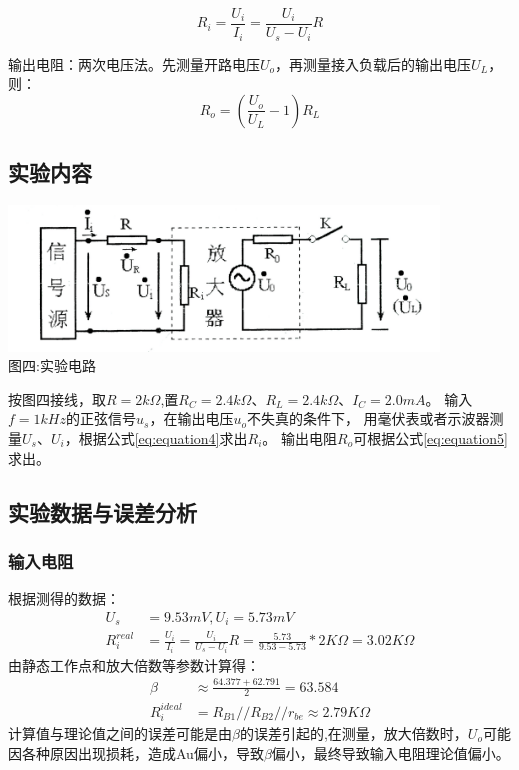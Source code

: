 \documentclass[a4paper]{article}
\begin{document}
    \begin{equation}
        R_i=\frac{U_i}{I_i}=\frac{U_i}{U_s-U_i}R\label{eq:equation4}
    \end{equation}

    {{输出电阻：两次电压法。先测量开路电压$U_o$，再测量接入负载后的输出电压$U_L$，则：}}
    \begin{equation}
        R_o=(\frac{U_o}{U_L}-1)R_L\label{eq:equation5}
    \end{equation}

    \subsection{实验内容}\label{subsec:10}
    \begin{center}
        \includegraphics[height=110pt]{R}\\
        {\small 图四:实验电路}
    \end{center}

    {{按图四接线，取$R=2k\Omega$,置$R_C=2.4k\Omega$、$R_L=2.4k\Omega$、$I_C=2.0mA$。
    输入$f=1kHz$的正弦信号$u_s$，在输出电压$u_o$不失真的条件下，
    用毫伏表或者示波器测量$U_s$、$U_i$，根据公式\eqref{eq:equation4}求出$R_i$。}}
    {{输出电阻$R_o$可根据公式\eqref{eq:equation5}求出。}}

    \subsection{实验数据与误差分析}\label{subsec:11}

    \subsubsection{输入电阻}
    {{根据测得的数据：}}
    \begin{equation}
        \begin{aligned}
            U_s&=9.53mV,U_i=5.73mV\\
            R_i^{real}&=\frac{U_i}{I_i}=\frac{U_i}{U_s-U_i}R=\frac{5.73}{9.53-5.73}*2K\Omega=3.02K\Omega
        \end{aligned}\label{eq:equation6}
    \end{equation}
    {{由静态工作点和放大倍数等参数计算得：}}
    \begin{equation}
        \begin{aligned}
            \beta&\approx\frac{64.377+62.791}{2}=63.584\\
            R_i^{ideal}&=R_{B1}//R_{B2}//r_{be}\approx2.79K\Omega
        \end{aligned}\label{eq:equation7}
    \end{equation}
    {{计算值与理论值之间的误差可能是由$\beta$的误差引起的,在测量，放大倍数时，$U_o$可能因各种原因出现损耗，造成Au偏小，导致$\beta$偏小，最终导致输入电阻理论值偏小。}}
\end{document}
